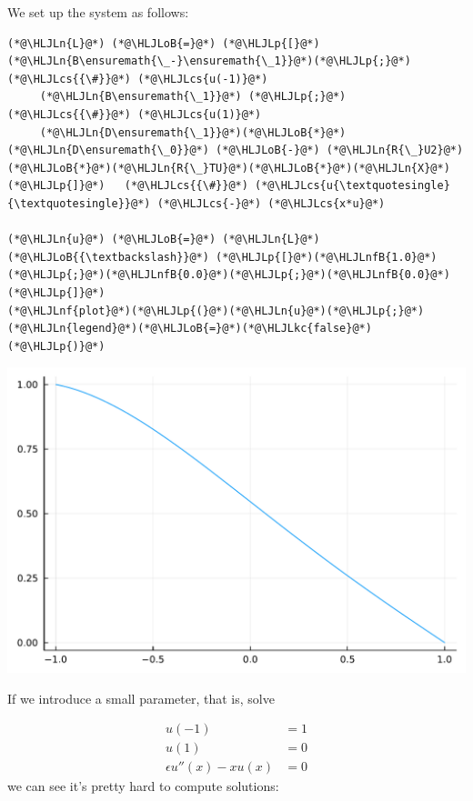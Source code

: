 \documentclass[12pt,a4paper]{article}
\newcommand{\HLJLkc}[1]{\textcolor[RGB]{59,151,46}{\textit{#1}}}
\newcommand{\HLJLn}[1]{#1}
\newcommand{\HLJLnf}[1]{\textcolor[RGB]{66,102,213}{#1}}
\newcommand{\HLJLnfB}[1]{\textcolor[RGB]{59,151,46}{#1}}
\newcommand{\HLJLoB}[1]{\textcolor[RGB]{102,102,102}{\textbf{#1}}}
\newcommand{\HLJLp}[1]{#1}
\newcommand{\HLJLcs}[1]{\textcolor[RGB]{153,153,119}{\textit{#1}}}
\begin{document}
We set up the system as follows:


\begin{lstlisting}
(*@\HLJLn{L}@*) (*@\HLJLoB{=}@*) (*@\HLJLp{[}@*)(*@\HLJLn{B\ensuremath{\_-}\ensuremath{\_1}}@*)(*@\HLJLp{;}@*)   (*@\HLJLcs{{\#}}@*) (*@\HLJLcs{u(-1)}@*)
     (*@\HLJLn{B\ensuremath{\_1}}@*) (*@\HLJLp{;}@*)   (*@\HLJLcs{{\#}}@*) (*@\HLJLcs{u(1)}@*)
     (*@\HLJLn{D\ensuremath{\_1}}@*)(*@\HLJLoB{*}@*)(*@\HLJLn{D\ensuremath{\_0}}@*) (*@\HLJLoB{-}@*) (*@\HLJLn{R{\_}U2}@*)(*@\HLJLoB{*}@*)(*@\HLJLn{R{\_}TU}@*)(*@\HLJLoB{*}@*)(*@\HLJLn{X}@*)(*@\HLJLp{]}@*)   (*@\HLJLcs{{\#}}@*) (*@\HLJLcs{u{\textquotesingle}{\textquotesingle}}@*) (*@\HLJLcs{-}@*) (*@\HLJLcs{x*u}@*)

(*@\HLJLn{u}@*) (*@\HLJLoB{=}@*) (*@\HLJLn{L}@*) (*@\HLJLoB{{\textbackslash}}@*) (*@\HLJLp{[}@*)(*@\HLJLnfB{1.0}@*)(*@\HLJLp{;}@*)(*@\HLJLnfB{0.0}@*)(*@\HLJLp{;}@*)(*@\HLJLnfB{0.0}@*)(*@\HLJLp{]}@*)
(*@\HLJLnf{plot}@*)(*@\HLJLp{(}@*)(*@\HLJLn{u}@*)(*@\HLJLp{;}@*) (*@\HLJLn{legend}@*)(*@\HLJLoB{=}@*)(*@\HLJLkc{false}@*)(*@\HLJLp{)}@*)
\end{lstlisting}

\includegraphics[width=\linewidth]{jl_dOthw0/OP_methods_43_1.pdf}

If we introduce a small parameter, that is, solve


\begin{align*}
u(-1) &= 1\\
u(1) &= 0\\
\epsilon u''(x) - xu(x) &= 0
\end{align*}
we can see it's pretty hard to compute solutions:
\end{document}
